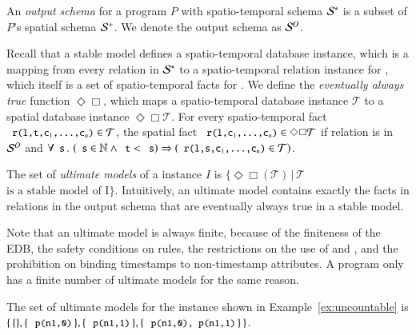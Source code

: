 An {\em output schema} for a \lang program $P$ with spatio-temporal schema
$\stschema$ is a subset of $P$'s spatial schema $\sschema$.  We denote the output schema as
$\oschema$.

Recall that a stable model defines a spatio-temporal database instance, which is a mapping from every relation  in $\stschema$ to a spatio-temporal relation instance for , which itself is a set of spatio-temporal facts for .  We define the {\em eventually always true} function $\Diamond\Box$, which maps a spatio-temporal database instance $\mathcal{T}$ to a spatial database instance $\Diamond\Box\mathcal{T}$.  For every spatio-temporal fact $\dedalus{r(l,t,c\sub{1},\ldots,c\sub{n})} \in \mathcal{T}$, the spatial fact $\dedalus{r(l,c\sub{1},\ldots,c\sub{n})} \in \Diamond\Box\mathcal{T}$ if relation  is in $\oschema$ and $\forall \dedalus{s}\, . \, \left(\dedalus{s} \in \mathbb{N} \land \dedalus{t} < \dedalus{s}\right) \Rightarrow \left(\dedalus{r(l,s,c\sub{1},\ldots,c\sub{n})} \in \mathcal{T}\right)$.

The set of {\em ultimate models} of a \lang instance $I$ is $\{\Diamond\Box(\mathcal{T}) \, | \, \mathcal{T}$  $\text{is a stable model of I}\}$.  Intuitively, an ultimate model contains exactly the facts in relations in the output schema that are eventually always true in a stable model.

Note that an ultimate model is always finite, because of the finiteness of the EDB, the safety conditions on rules, the restrictions on the use of  and , and the prohibition on binding timestamps to non-timestamp attributes.  A \lang program only has a finite number of ultimate models for the same reason.

\begin{example}
The set of ultimate models for the \lang instance shown in Example~\ref{ex:uncountable} is $\{ \, \{\}, \{ \, \dedalus{p(n1,0)} \, \}, \{ \, \dedalus{p(n1,1)} \, \}, \{ \, \dedalus{p(n1,0), p(n1,1)} \, \} \, \}$.
\end{example}



